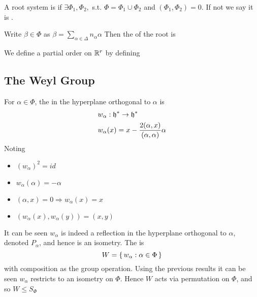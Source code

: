 \documentclass{article}
\begin{document}
\begin{definition}
	A root system is  if $\exists \Phi_1, \Phi_2,$ s.t. $\Phi = \Phi_1 \cup \Phi_2$ and $(\Phi_1, \Phi_2)=0$. If not we say it is . 
\end{definition}



\begin{definition}[Height]
	Write $\beta \in \Phi$ as $\beta = \sum_{\alpha \in \Delta} n_\alpha \alpha$ Then the  of the root is 
\end{definition}

We define a partial order on $\mathbb{R}^r$ by defining 


\subsection{The Weyl Group}

\begin{definition}
	For $\alpha\in\Phi$, the  in the hyperplane orthogonal to $\alpha$ is 
	\begin{align*}
	& w_\alpha : \mathfrak{h}^\ast \to \mathfrak{h}^\ast \\
	& w_\alpha (x) = x - \frac{2(\alpha,x)}{(\alpha,\alpha)}\alpha
	\end{align*}
	Noting 
	\begin{itemize}
		\item $(w_\alpha)^2=id$
		\item $w_\alpha (\alpha) = -\alpha$
		\item $(\alpha,x)=0 \Rightarrow w_\alpha (x) = x$
		\item $(w_\alpha(x),w_\alpha(y)) = (x,y)$
	\end{itemize}
	It can be seen $w_\alpha$ is indeed a reflection in the hyperplane orthogonal to $\alpha$, denoted $P_\alpha$, and hence is an isometry. The  is 
	\[
	W=\set{  w_\alpha : \alpha\in\Phi  }
	\]
	with composition as the group operation. Using the previous results it can be seen $w_\alpha$ restricts to an isometry on $\Phi$. Hence $W$ acts via permutation on $\Phi$, and so $W\leq S_\Phi$
\end{definition}
\end{document}
